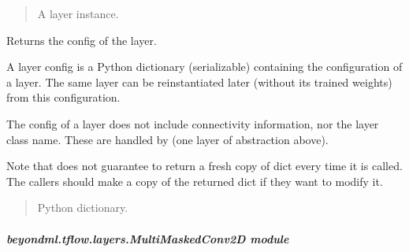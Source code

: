 \documentclass[letterpaper,10pt,english]{sphinxmanual}
\begin{document}
\begin{fulllineitems}
\begin{fulllineitems}
\begin{quote}
\begin{description}
\sphinxAtStartPar
A layer instance.

\end{description}\end{quote}

\end{fulllineitems}


\begin{fulllineitems}
\label{\detokenize{beyondml.tflow.layers:beyondml.tflow.layers.MultiDense.MultiDense.get_config}}
\pysigstartsignatures
{}
\pysigstopsignatures
\sphinxAtStartPar
Returns the config of the layer.

\sphinxAtStartPar
A layer config is a Python dictionary (serializable)
containing the configuration of a layer.
The same layer can be reinstantiated later
(without its trained weights) from this configuration.

\sphinxAtStartPar
The config of a layer does not include connectivity
information, nor the layer class name. These are handled
by  (one layer of abstraction above).

\sphinxAtStartPar
Note that  does not guarantee to return a fresh copy of
dict every time it is called. The callers should make a copy of the
returned dict if they want to modify it.
\begin{quote}\begin{description}
\sphinxAtStartPar
Python dictionary.

\end{description}\end{quote}

\end{fulllineitems}


\end{fulllineitems}



\subparagraph{beyondml.tflow.layers.MultiMaskedConv2D module}
\label{\detokenize{beyondml.tflow.layers:module-beyondml.tflow.layers.MultiMaskedConv2D}}\label{\detokenize{beyondml.tflow.layers:beyondml-tflow-layers-multimaskedconv2d-module}}
\end{document}
